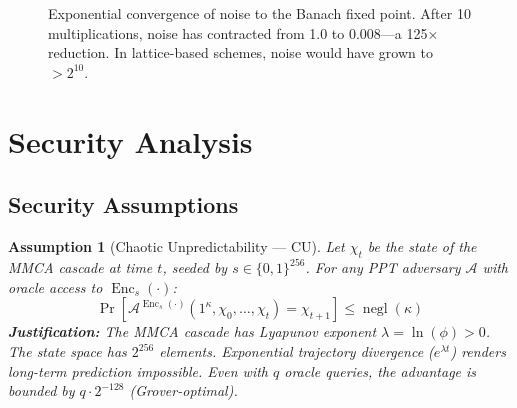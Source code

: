 \documentclass[11pt,a4paper]{article}
\newtheorem{assumption}[theorem]{Assumption}
\DeclareMathOperator{\Enc}{Enc}
\DeclareMathOperator{\negl}{negl}
\begin{document}
\begin{figure}[H]
\centering
{}
\caption{Exponential convergence of noise to the Banach fixed point. After 10 multiplications, noise has contracted from 1.0 to 0.008—a 125× reduction. In lattice-based schemes, noise would have grown to $>2^{10}$.}
\label{fig:noise_convergence}
\end{figure}

\newpage

\section{Security Analysis}
\label{sec:security}

\subsection{Security Assumptions}

\begin{assumption}[Chaotic Unpredictability — CU]
\label{ass:cu}
Let $\chi_t$ be the state of the MMCA cascade at time $t$, seeded by $s \in \{0,1\}^{256}$. For any PPT adversary $\mathcal{A}$ with oracle access to $\Enc_s(\cdot)$:
\[
\Pr[\mathcal{A}^{\Enc_s(\cdot)}(1^\kappa, \chi_0, \ldots, \chi_t) = \chi_{t+1}] \leq \negl(\kappa)
\]
\textbf{Justification:} The MMCA cascade has Lyapunov exponent $\lambda = \ln(\phi) > 0$. The state space has $2^{256}$ elements. Exponential trajectory divergence ($e^{\lambda t}$) renders long-term prediction impossible. Even with $q$ oracle queries, the advantage is bounded by $q \cdot 2^{-128}$ (Grover-optimal).
\end{assumption}
\end{document}
